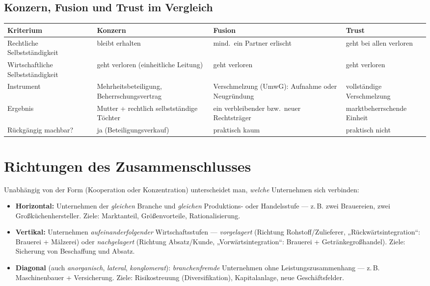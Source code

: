 \documentclass[11pt, a4paper]{article}
\begin{document}
\subsection{Konzern, Fusion und Trust im Vergleich}

\begin{center}
\small
\begin{tabular}{p{3.4cm} p{3.6cm} p{3.6cm} p{3.4cm}}
\toprule
\rowcolor{bfwTabHead}\textbf{Kriterium} & \textbf{Konzern} & \textbf{Fusion} & \textbf{Trust}\\
\midrule
Rechtliche Selbstständigkeit & bleibt erhalten & mind.\ ein Partner erlischt & geht bei allen verloren\\
\addlinespace
Wirtschaftliche Selbstständigkeit & geht verloren (einheitliche Leitung) & geht verloren & geht verloren\\
\addlinespace
Instrument & Mehrheitsbeteiligung, Beherrschungsvertrag & Verschmelzung (UmwG): Aufnahme oder Neugründung & vollständige Verschmelzung\\
\addlinespace
Ergebnis & Mutter + rechtlich selbstständige Töchter & ein verbleibender bzw.\ neuer Rechtsträger & marktbeherrschende Einheit\\
\addlinespace
Rückgängig machbar? & ja (Beteiligungsverkauf) & praktisch kaum & praktisch nicht\\
\bottomrule
\end{tabular}
\end{center}

\section{Richtungen des Zusammenschlusses}

Unabhängig von der Form (Kooperation oder Konzentration) unterscheidet man, \emph{welche}
Unternehmen sich verbinden:

\begin{itemize}
  \item \textbf{Horizontal:} Unternehmen der \emph{gleichen} Branche und
    \emph{gleichen} Produktions- oder Handelsstufe --- z.\,B. zwei Brauereien, zwei
    Großküchenhersteller. Ziele: Marktanteil, Größenvorteile, Rationalisierung.
  \item \textbf{Vertikal:} Unternehmen \emph{aufeinanderfolgender} Wirtschaftsstufen ---
    \emph{vorgelagert} (Richtung Rohstoff/Zulieferer, „Rückwärtsintegration``: Brauerei +
    Mälzerei) oder \emph{nachgelagert} (Richtung Absatz/Kunde, „Vorwärtsintegration``:
    Brauerei + Getränkegroßhandel). Ziele: Sicherung von Beschaffung und Absatz.
  \item \textbf{Diagonal} (auch \emph{anorganisch}, \emph{lateral},
    \emph{konglomerat}): \emph{branchenfremde} Unternehmen ohne
    Leistungszusammenhang --- z.\,B. Maschinenbauer + Versicherung. Ziele:
    Risikostreuung (Diversifikation), Kapitalanlage, neue Geschäftsfelder.
\end{itemize}
\end{document}
